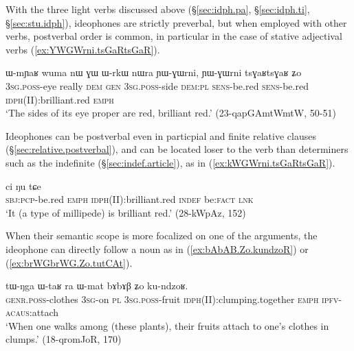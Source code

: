 With the three light verbs discussed above (§\ref{sec:idph.pa}, §\ref{sec:idph.ti}, §\ref{sec:stu.idph}), ideophones are strictly preverbal, but when employed with other verbs, postverbal order is common, in particular in the case of stative adjectival verbs (\ref{ex:YWGWrni.tsGaRtsGaR}).

\begin{exe}
\ex \label{ex:YWGWrni.tsGaRtsGaR}
\gll ɯ-mɲaʁ wuma nɯ ɣɯ ɯ-rkɯ nɯra ɲɯ-ɣɯrni, ɲɯ-ɣɯrni tsɣaʁtsɣaʁ ʑo \\
\textsc{3sg}.\textsc{poss}-eye really \textsc{dem} \textsc{gen} \textsc{3sg}.\textsc{poss}-side \textsc{dem}:\textsc{pl} \textsc{sens}-be.red  \textsc{sens}-be.red \textsc{idph}(II):brilliant.red \textsc{emph} \\
 \glt `The sides of its eye proper are red, brilliant red.'  (23-qapGAmtWmtW, 50-51)
 \end{exe}

Ideophones can be postverbal even in particpial and finite relative clauses (§\ref{sec:relative.postverbal}), and can be located loser to the verb than determiners such as the indefinite  (§\ref{sec:indef.article}), as in (\ref{ex:kWGWrni.tsGaRtsGaR}).

 \begin{exe}
\ex \label{ex:kWGWrni.tsGaRtsGaR}
 ci ŋu tɕe \\
\textsc{sbj}:\textsc{pcp}-be.red \textsc{emph} \textsc{idph}(II):brilliant.red \textsc{indef} be:\textsc{fact} \textsc{lnk} \\
\glt `It (a type of millipede) is brilliant red.' (28-kWpAz, 152)
   \end{exe} 
   
 When their semantic scope is more focalized on one of the arguments, the ideophone can directly follow a noun as in (\ref{ex:bAbAB.Zo.kundzoR}) or (\ref{ex:brWGbrWG.Zo.tutCAt}).

\begin{exe}
\ex \label{ex:bAbAB.Zo.kundzoR}
\gll tɯ-ŋga ɯ-taʁ ra ɯ-mat bɤbɤβ ʑo ku-ndzoʁ. \\
\textsc{genr}.\textsc{poss}-clothes \textsc{3sg}-on \textsc{pl}  \textsc{3sg}.\textsc{poss}-fruit \textsc{idph}(II):clumping.together \textsc{emph} \textsc{ipfv}-\textsc{acaus}:attach \\
\glt `When one walks among (these plants), their fruits attach to one's clothes in clumps.' (18-qromJoR, 170)
\end{exe}

